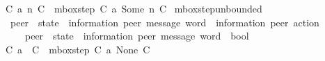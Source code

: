 \begin{isabellebody}
\ \ {\isachardoublequoteopen}C{}\ {\isasymmidarrow}{\isasymlangle}a{\isacharcomma}{\kern0pt}\ n{\isasymrangle}{\isasymrightarrow}\ C{}\ {\isasymequiv}\ mbox{\isacharunderscore}{\kern0pt}step\ C{}\ a\ {\isacharparenleft}{\kern0pt}Some\ n{\isacharparenright}{\kern0pt}\ C{}{\isachardoublequoteclose}\isanewline
\isanewline
{}\isamarkupfalse%
\ mbox{\isacharunderscore}{\kern0pt}step{\isacharunderscore}{\kern0pt}unbounded\isanewline
\ \ {\isacharcolon}{\kern0pt}{\isacharcolon}{\kern0pt}\ {\isachardoublequoteopen}{\isacharparenleft}{\kern0pt}{\isacharprime}{\kern0pt}peer\ {\isasymRightarrow}\ {\isacharparenleft}{\kern0pt}{\isacharprime}{\kern0pt}state\ {\isasymtimes}\ {\isacharparenleft}{\kern0pt}{\isacharprime}{\kern0pt}information{\isacharcomma}{\kern0pt}\ {\isacharprime}{\kern0pt}peer{\isacharparenright}{\kern0pt}\ message\ word{\isacharparenright}{\kern0pt}{\isacharparenright}{\kern0pt}\ {\isasymRightarrow}\ {\isacharparenleft}{\kern0pt}{\isacharprime}{\kern0pt}information{\isacharcomma}{\kern0pt}\ {\isacharprime}{\kern0pt}peer{\isacharparenright}{\kern0pt}\ action\ {\isasymRightarrow}\isanewline
\ \ \ \ \ \ {\isacharparenleft}{\kern0pt}{\isacharprime}{\kern0pt}peer\ {\isasymRightarrow}\ {\isacharparenleft}{\kern0pt}{\isacharprime}{\kern0pt}state\ {\isasymtimes}\ {\isacharparenleft}{\kern0pt}{\isacharprime}{\kern0pt}information{\isacharcomma}{\kern0pt}\ {\isacharprime}{\kern0pt}peer{\isacharparenright}{\kern0pt}\ message\ word{\isacharparenright}{\kern0pt}{\isacharparenright}{\kern0pt}\ {\isasymRightarrow}\ bool{\isachardoublequoteclose}\isanewline
\ \ \ \ \ {\isacharparenleft}{\kern0pt}{\isachardoublequoteopen}{\isacharunderscore}{\kern0pt}\ {\isasymmidarrow}{\isasymlangle}{\isacharunderscore}{\kern0pt}{\isacharcomma}{\kern0pt}\ {\isasyminfinity}{\isasymrangle}{\isasymrightarrow}\ {\isacharunderscore}{\kern0pt}{\isachardoublequoteclose}\ {\isacharbrackleft}{\kern0pt}{}{}{\isacharcomma}{\kern0pt}\ {}{}{\isacharcomma}{\kern0pt}\ {}{}{\isacharbrackright}{\kern0pt}\ {}{}{}{\isacharparenright}{\kern0pt}\ \isanewline
\ \ {\isachardoublequoteopen}C{}\ {\isasymmidarrow}{\isasymlangle}a{\isacharcomma}{\kern0pt}\ {\isasyminfinity}{\isasymrangle}{\isasymrightarrow}\ C{}\ {\isasymequiv}\ mbox{\isacharunderscore}{\kern0pt}step\ C{}\ a\ None\ C{}{\isachardoublequoteclose}\isanewline
\isanewline
{}\isamarkupfalse%

\end{isabellebody}
